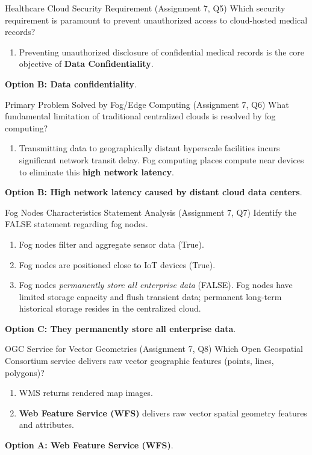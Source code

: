 \begin{solved}{Healthcare Cloud Security Requirement (Assignment 7, Q5)}
\Given Which security requirement is paramount to prevent unauthorized access to cloud-hosted medical records?
\Steps
\begin{enumerate}[leftmargin=*]
  \item Preventing unauthorized disclosure of confidential medical records is the core objective of \textbf{Data Confidentiality}.
\end{enumerate}
\Answer \textbf{Option B: Data confidentiality}.
\end{solved}

\begin{solved}{Primary Problem Solved by Fog/Edge Computing (Assignment 7, Q6)}
\Given What fundamental limitation of traditional centralized clouds is resolved by fog computing?
\Steps
\begin{enumerate}[leftmargin=*]
  \item Transmitting data to geographically distant hyperscale facilities incurs significant network transit delay. Fog computing places compute near devices to eliminate this \textbf{high network latency}.
\end{enumerate}
\Answer \textbf{Option B: High network latency caused by distant cloud data centers}.
\end{solved}

\begin{solved}{Fog Nodes Characteristics Statement Analysis (Assignment 7, Q7)}
\Given Identify the FALSE statement regarding fog nodes.
\Steps
\begin{enumerate}[leftmargin=*]
  \item Fog nodes filter and aggregate sensor data (True).
  \item Fog nodes are positioned close to IoT devices (True).
  \item Fog nodes \emph{permanently store all enterprise data} (FALSE). Fog nodes have limited storage capacity and flush transient data; permanent long-term historical storage resides in the centralized cloud.
\end{enumerate}
\Answer \textbf{Option C: They permanently store all enterprise data}.
\end{solved}

\begin{solved}{OGC Service for Vector Geometries (Assignment 7, Q8)}
\Given Which Open Geospatial Consortium service delivers raw vector geographic features (points, lines, polygons)?
\Steps
\begin{enumerate}[leftmargin=*]
  \item WMS returns rendered map images.
  \item \textbf{Web Feature Service (WFS)} delivers raw vector spatial geometry features and attributes.
\end{enumerate}
\Answer \textbf{Option A: Web Feature Service (WFS)}.
\end{solved}

